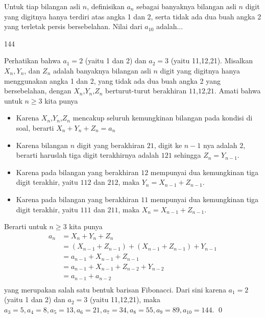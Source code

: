 \documentclass[11pt]{scrartcl}
\begin{document}
		\begin{soalbaru}
			Untuk tiap bilangan asli $n$, definisikan $a_n$ sebagai banyaknya bilangan asli $n$
				digit yang digitnya hanya terdiri atas angka 1 dan 2, serta tidak ada
				dua buah angka 2 yang terletak persis bersebelahan. Nilai dari $a_{10}$ adalah...
		
		\begin{jawaban}
		144
		\end{jawaban}
		\begin{solusi}
		Perhatikan bahwa $a_1=2$ (yaitu 1 dan 2) dan $a_2=3$ (yaitu 11,12,21).
		Misalkan $X_n,Y_n$, dan $Z_n$ adalah banyaknya bilangan asli $n$ digit yang digitnya hanya menggunakan angka 1 dan 2, yang tidak ada dua buah angka 2 yang bersebelahan, dengan $X_n$,$Y_n$,$Z_n$ berturut-turut berakhiran $11$,$12$,$21$. Amati bahwa untuk $n \ge 3$ kita punya \begin{itemize}
		\item Karena $X_n$,$Y_n$,$Z_n$ mencakup seluruh kemungkinan bilangan pada kondisi di soal, berarti $X_n+Y_n+Z_n=a_n$
		\item Karena bilangan $n$ digit yang berakhiran $21$, digit ke $n-1$ nya adalah $2$, berarti haruslah tiga digit terakhirnya adalah $121$ sehingga $Z_n = Y_{n-1}$.
		\item Karena pada bilangan yang berakhiran $12$ mempunyai dua kemungkinan tiga digit terakhir, yaitu $112$ dan $212$, maka $Y_n=X_{n-1}+Z_{n-1}$.
		\item Karena pada bilangan yang berakhiran $11$ mempunyai dua kemungkinan tiga digit terakhir, yaitu $111$ dan $211$, maka $X_n=X_{n-1}+Z_{n-1}$.
		\end{itemize}
		Berarti untuk $n \ge 3$ kita punya\\[-30pt]
		 \begin{align*}
				a_n &= X_n+Y_n+Z_n\\
					&= (X_{n-1}+Z_{n-1})+(X_{n-1}+Z_{n-1})+Y_{n-1}\\
					&= a_{n-1}+X_{n-1}+Z_{n-1}\\
					&= a_{n-1}+X_{n-1}+Z_{n-2}+Y_{n-2}\\
					&= a_{n-1}+a_{n-2}\\[-30pt]
				\end{align*}
		yang merupakan salah satu bentuk barisan Fibonacci. Dari sini karena $a_1=2$ (yaitu 1 dan 2) dan $a_2=3$ (yaitu 11,12,21), maka $a_3=5, a_4=8, a_5=13, a_6=21, a_7=34, a_8=55, a_9=89, a_{10}=144$. \qed
		\end{solusi}
			\end{soalbaru}
\end{document}
